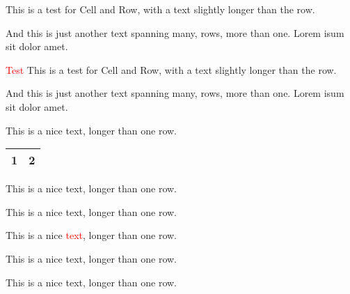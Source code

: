 \documentclass{scrartcl}
\begin{document}
%
\begin{Row}%
\begin{Cell}{2}
This is a test for Cell and Row, with a text slightly longer than the row.
\end{Cell}
\begin{Cell}{1}
And this is just another text spanning many, rows, more than one. Lorem isum sit dolor amet.
\end{Cell}
\end{Row}

\bigskip

\begin{Row}%
\begin{Cell}{2}
\textcolor{red}{Test}
This is a test for Cell and Row, with a text slightly longer than the row.
\end{Cell}%
\begin{Cell}{1}
And this is just another text spanning many, rows, more than one. Lorem isum sit dolor amet.
\end{Cell}%
\end{Row}

\bigskip

\begin{row}[cellsep=0.5cm]{3}{3}%
\begin{cell}{1}
This is a nice text, longer than one row.

\begin{tabular}{cc}\hline
1 & 2\\\hline
\end{tabular}
\end{cell}
\begin{cell}{1}
This is a nice text, longer than one row.
\end{cell}
\begin{cell}{1}
This is a nice text, longer than one row.
\end{cell}
\end{row}

\begin{row}[cellsep=0.5cm]{3}{3}%
\begin{cell}{1}
This is a nice \textcolor{red}{text}, longer than one row.
\end{cell}
\begin{cell}{1}
This is a nice text, longer than one row.
\end{cell}
\begin{cell}{1}
This is a nice text, longer than one row.
\end{cell}
\end{row}

\bigskip

\end{document}
